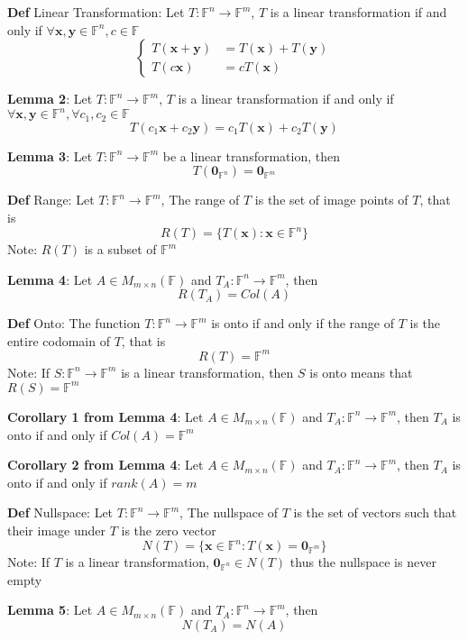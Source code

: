 \documentclass[11pt,notitlepage]{report}
\newcommand{\bb}[1]{\ensuremath{\mathbb{#1}}}
\newcommand{\tbf}[1]{\textbf{#1}}
\begin{document}
\textbf{Def} Linear Transformation: Let $T: \bb F^n \rightarrow \bb F^m$, $T$ is a linear transformation if and only if $\forall \tbf x, \tbf y \in \bb F^n, c \in \bb F$
$$\begin{cases}T(\tbf x + \tbf y) &= T(\tbf x) + T(\tbf y)\\ T(c\tbf x) &= cT(\tbf x)
\end{cases}$$

\textbf{Lemma 2}: Let $T: \bb F^n \rightarrow \bb F^m$, $T$ is a linear transformation if and only if $\forall \tbf x, \tbf y \in \bb F^n, \forall c_1, c_2 \in \bb F$
$$T(c_1\tbf x + c_2\tbf y) = c_1T(\tbf x) + c_2T(\tbf y)$$

\textbf{Lemma 3}: Let $T: \bb F^n \rightarrow \bb F^m$ be a linear transformation, then
$$T(\tbf 0_{\bb F^n}) = \tbf 0_{\bb F^m}$$

\textbf{Def} Range: Let $T: \bb F^n \rightarrow \bb F^m$, The range of $T$ is the set of image points of $T$, that is
$$R(T) = \{T(\tbf x) : \tbf x \in \bb F^n\}$$
\hspace*{5mm} Note: $R(T)$ is a subset of $\bb F^m$

\textbf{Lemma 4}: Let $A \in M_{m \times n}(\bb F)$ and $T_A: \bb F^n \rightarrow \bb F^m$, then
$$R(T_A) = Col(A)$$

\textbf{Def} Onto: The function $T: \bb F^n \rightarrow \bb F^m$ is onto if and only if the range of $T$ is the entire codomain of $T$, that is
$$R(T) = \bb F^m$$
\hspace*{5mm} Note: If $S: \bb F^n \rightarrow \bb F^m$ is a linear transformation, then $S$ is onto means that $R(S) = \bb F^m$

\textbf{Corollary 1 from Lemma 4}: Let $A \in M_{m \times n}(\bb F)$ and $T_A : \bb F^n \rightarrow \bb F^m$, then $T_A$ is onto if and only if $Col(A) = \bb F^m$

\textbf{Corollary 2 from Lemma 4}: Let $A \in M_{m \times n}(\bb F)$ and $T_A : \bb F^n \rightarrow \bb F^m$, then $T_A$ is onto if and only if $rank(A) = m$

\textbf{Def} Nullspace: Let $T: \bb F^n \rightarrow \bb F^m$, The nullspace of $T$ is the set of vectors such that their image under $T$ is the zero vector
$$N(T) = \{\tbf x \in \bb F^n: T(\tbf x) = \tbf 0_{\bb F^m}\}$$
\hspace*{5mm} Note: If $T$ is a linear transformation, $\tbf 0_{\bb F^n} \in N(T)$ thus the nullspace is never empty

\textbf{Lemma 5}: Let $A \in M_{m \times n}(\bb F)$ and $T_A : \bb F^n \rightarrow \bb F^m$, then
$$N(T_A) = N(A)$$
\end{document}
